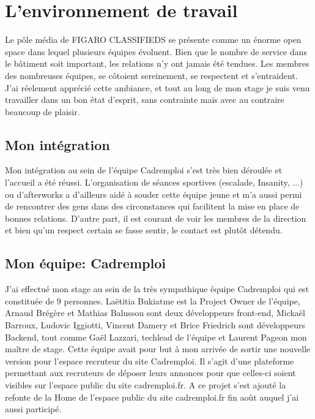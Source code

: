 
\section{L'environnement de travail}
Le pôle média de FIGARO CLASSIFIEDS se présente comme un énorme open space dans lequel plusieurs équipes évoluent.
Bien que le nombre de service dans le bâtiment soit important, les relations n'y ont jamais été tendues.
Les membres des nombreuses équipes, se côtoient sereinement, se respectent et s'entraident.
J'ai réelement apprécié cette ambiance, et tout au long de mon stage je suis venu travailler dans un bon état d'esprit, sans contrainte mais avec au contraire beaucoup de plaisir.
\subsection{Mon intégration}
\label{sub:Mon intégration}
Mon intégration au sein de l'équipe Cadremploi s'est très bien déroulée et l'accueil a été réussi.
L'organisation de séances sportives (escalade, Insanity, ...) ou d'afterworks a d'ailleurs aidé à souder cette équipe jeune et m'a aussi permi de rencontrer des gens dans des circonstances qui facilitent la mise en place de bonnes relations.
D'autre part, il est courant de voir les membres de la direction et bien qu'un respect certain se fasse sentir, le contact est plutôt détendu.
\subsection{Mon équipe: Cadremploi}
\label{sub:Mon équipe}
J'ai effectué mon stage au sein de la très sympathique équipe Cadremploi qui est constituée de 9 personnes. Laëtitia Bukiatme est la Project Owner de l'équipe, Arnaud Brégère et Mathias Balussou sont deux développeurs front-end, Mickaël Barroux, Ludovic Iggiotti, Vincent Damery et Brice Friedrich sont développeurs Backend, tout comme Gaël Lazzari, techlead de l'équipe et Laurent Pageon mon maître de stage.
Cette équipe avait pour but à mon arrivée de sortir une nouvelle version pour l'espace recruteur du site Cadremploi.
Il s'agit d'une plateforme permettant aux recruteurs de déposer leurs annonces pour que celles-ci soient visibles sur l'espace public du site cadremploi.fr.
A ce projet s'est ajouté la refonte de la Home de l'espace public du site cadremploi.fr fin août auquel j'ai aussi participé.
